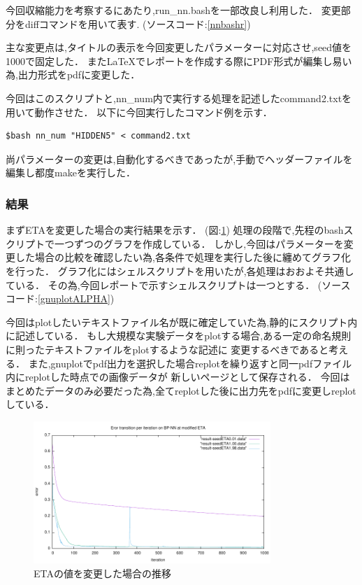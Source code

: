 今回収縮能力を考察するにあたり,run\_nn.bashを一部改良し利用した． 変更部分をdiffコマンドを用いて表す. (ソースコード:\ref{nnbashr})

主な変更点は,タイトルの表示を今回変更したパラメーターに対応させ,seed値を1000で固定した．
また\LaTeX でレポートを作成する際にPDF形式が編集し易い為,出力形式をpdfに変更した．

今回はこのスクリプトと,nn\_num内で実行する処理を記述したcommand2.txtを用いて動作させた．
以下に今回実行したコマンド例を示す．
\begin{oframed}\begin{verbatim}
$bash nn_num "HIDDEN5" < command2.txt
      \end{verbatim}
\end{oframed}

尚パラメーターの変更は,自動化するべきであったが,手動でヘッダーファイルを編集し都度makeを実行した．

\subsubsection{結果}

まずETAを変更した場合の実行結果を示す． (図:\ref{fig:ETAresult})
処理の段階で,先程のbashスクリプトで一つずつのグラフを作成している．
しかし,今回はパラメーターを変更した場合の比較を確認したい為,各条件で処理を実行した後に纏めてグラフ化を行った．
グラフ化にはシェルスクリプトを用いたが,各処理はおおよそ共通している．
その為,今回レポートで示すシェルスクリプトは一つとする． (ソースコード:\ref{gnuplotALPHA})



今回はplotしたいテキストファイル名が既に確定していた為,静的にスクリプト内に記述している．
もし大規模な実験データをplotする場合,ある一定の命名規則に則ったテキストファイルをplotするような記述に
変更するべきであると考える．
また,gnuplotでpdf出力を選択した場合replotを繰り返すと同一pdfファイル内にreplotした時点での画像データが
新しいページとして保存される．
今回はまとめたデータのみ必要だった為,全てreplotした後に出力先をpdfに変更しreplotしている．

\begin{figure}[H]
    \centering
    \includegraphics[width=0.8\textwidth]{figs/Level3.2/ETA.pdf}
    \caption{ETAの値を変更した場合の推移}
\label{fig:ETAresult}
\end{figure}

